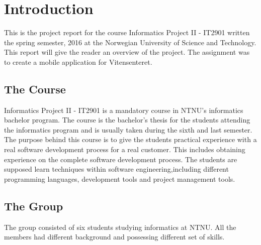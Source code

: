 \chapter{Introduction}
This is the project report for the course Informatics Project II - IT2901 written the spring semester, 2016 at the Norwegian University of Science and Technology. This report will give the reader an overview of the project. The assignment was to create a mobile application for Vitensenteret.

\section{The Course}
Informatics Project II - IT2901 \cite{course} is a mandatory course in NTNU's informatics bachelor program. The course is the bachelor's thesis for the students attending the informatics program and is usually taken during the sixth and last semester. The purpose behind this course is to give the students practical experience with a real software development  process for a real customer. This includes obtaining experience on the complete software development process. The students are supposed learn techniques within software engineering,including different programming languages, development tools and project management tools.  

\section{The Group}
The group consisted of six students studying informatics at NTNU. All the members had different background and possessing different set of skills.

